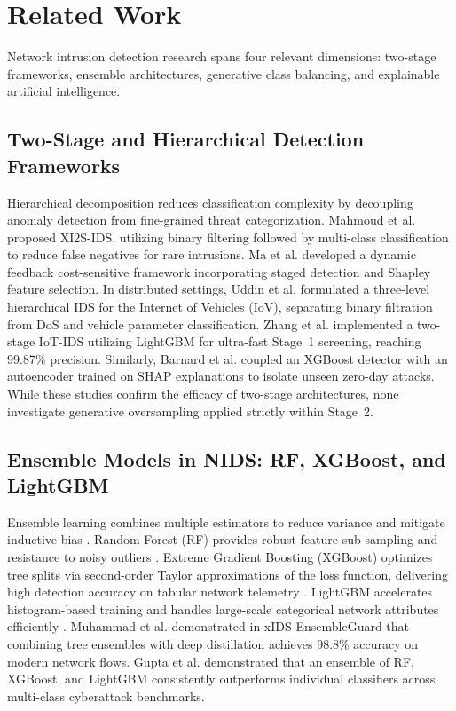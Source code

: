 \documentclass[journal]{IEEEtran}
\begin{document}
\section{Related Work}
\label{sec:related_work}

Network intrusion detection research spans four relevant dimensions: two-stage frameworks, ensemble architectures, generative class balancing, and explainable artificial intelligence.

\subsection{Two-Stage and Hierarchical Detection Frameworks}
Hierarchical decomposition reduces classification complexity by decoupling anomaly detection from fine-grained threat categorization. Mahmoud et al. \cite{mahmoud2025xi2s} proposed XI2S-IDS, utilizing binary filtering followed by multi-class classification to reduce false negatives for rare intrusions. Ma et al. \cite{ma2025dynamic} developed a dynamic feedback cost-sensitive framework incorporating staged detection and Shapley feature selection. In distributed settings, Uddin et al. \cite{uddin2025scalable} formulated a three-level hierarchical IDS for the Internet of Vehicles (IoV), separating binary filtration from DoS and vehicle parameter classification. Zhang et al. \cite{zhang2023efficient} implemented a two-stage IoT-IDS utilizing LightGBM for ultra-fast Stage~1 screening, reaching 99.87\% precision. Similarly, Barnard et al. \cite{barnard2022robust} coupled an XGBoost detector with an autoencoder trained on SHAP explanations to isolate unseen zero-day attacks. While these studies confirm the efficacy of two-stage architectures, none investigate generative oversampling applied strictly within Stage~2.

\subsection{Ensemble Models in NIDS: RF, XGBoost, and LightGBM}
Ensemble learning combines multiple estimators to reduce variance and mitigate inductive bias \cite{bibers2025ensemble, alabdulatif2025novel}. Random Forest (RF) provides robust feature sub-sampling and resistance to noisy outliers \cite{gupta2025improving}. Extreme Gradient Boosting (XGBoost) optimizes tree splits via second-order Taylor approximations of the loss function, delivering high detection accuracy on tabular network telemetry \cite{haque2026explainable, muhammad2025xids}. LightGBM accelerates histogram-based training and handles large-scale categorical network attributes efficiently \cite{zhang2023efficient}. Muhammad et al. \cite{muhammad2025xids} demonstrated in xIDS-EnsembleGuard that combining tree ensembles with deep distillation achieves 98.8\% accuracy on modern network flows. Gupta et al. \cite{gupta2025improving} demonstrated that an ensemble of RF, XGBoost, and LightGBM consistently outperforms individual classifiers across multi-class cyberattack benchmarks.
\end{document}

